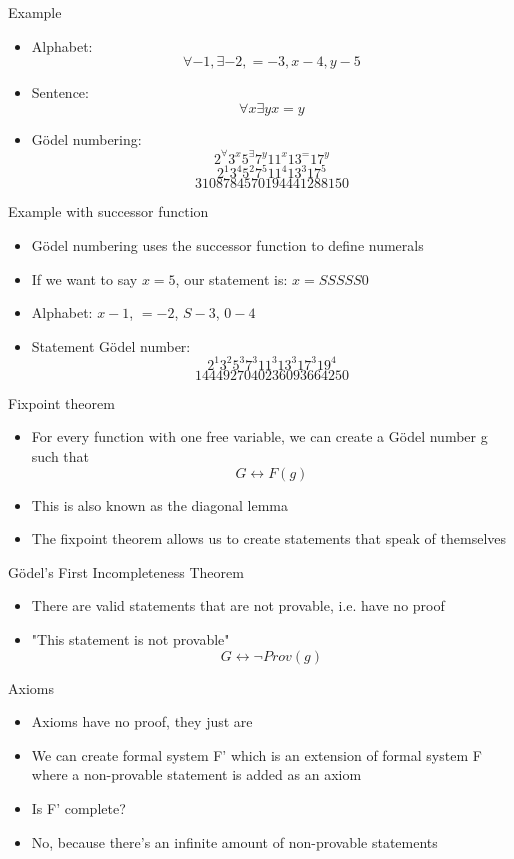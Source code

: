 \documentclass[utf8]{beamer}
\let\iff\leftrightarrow
\begin{document}
\begin{frame}{Example}
\begin{itemize}
\item Alphabet:
\[ \forall - 1, \exists - 2, = - 3, x - 4, y - 5 \]
\item Sentence:
\[ \forall x \exists y x = y \]
\item G{\"o}del numbering:
\[ 2^\forall 3^x 5^\exists 7^y 11^x 13^= 17^y \]
\[ 2^1 3^4 5^2 7^5 11^4 13^3 17^5 \]
\[ 3108784570194441288150 \]
\end{itemize}
\end{frame}

\begin{frame}{Example with successor function}
\begin{itemize}
\item G{\"o}del numbering uses the successor function to define numerals
\item If we want to say $x = 5$, our statement is: $x = SSSSS0$
\item Alphabet: $x - 1$, $= - 2$, $S - 3$, $0 - 4$
\item Statement G{\"o}del number:
\[ 2^1 3^2 5^3 7^3 11^3 13^3 17^3 19^4\]
\[ 1444927040236093664250 \]
\end{itemize}
\end{frame}

\begin{frame}{Fixpoint theorem}
\begin{itemize}
\item For every function with one free variable, we can create a G{\"o}del number g such that
\[ G \iff F(g) \]
\item This is also known as the diagonal lemma
\item The fixpoint theorem allows us to create statements that speak of themselves
\end{itemize}
\end{frame}

\begin{frame}{G{\"o}del's First Incompleteness Theorem}
\begin{itemize}
\item There are valid statements that are not provable, i.e. have no proof
\item "This statement is not provable"
\[ G \iff \neg Prov(g) \]
\end{itemize}
\end{frame}

\begin{frame}{Axioms}
\begin{itemize}
\item Axioms have no proof, they just are
\item We can create formal system F' which is an extension of formal system F where a non-provable statement is added
as an axiom
\item Is F' complete?
\item No, because there's an infinite amount of non-provable statements
\end{itemize}
\end{frame}
\end{document}
